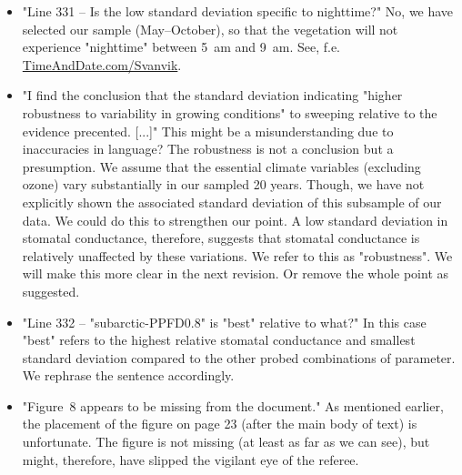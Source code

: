 \documentclass{scrartcl}
\begin{document}
\begin{itemize}
    \item {\color{blue} "Line 331 -- Is the low standard deviation specific to nighttime?"} No, we have selected our sample (May--October), so that the vegetation will not experience "nighttime" between 5~am and 9~am. See, f.e. \href{https://www.timeanddate.com/sun/@777232}{TimeAndDate.com/Svanvik}.
    \item {\color{blue} "I find the conclusion that the standard deviation indicating "higher robustness to variability in growing conditions" to sweeping relative to the evidence precented. [...]"} This might be a misunderstanding due to inaccuracies in language? The robustness is not a conclusion but a presumption. We assume that the essential climate variables (excluding ozone) vary substantially in our sampled 20 years. Though, we have not explicitly shown the associated standard deviation of this subsample of our data. We could do this to strengthen our point. A low standard deviation in stomatal conductance, therefore, suggests that stomatal conductance is relatively unaffected by these variations. We refer to this as "robustness". We will make this more clear in the next revision. Or remove the whole point as suggested.
    \item {\color{blue} "Line 332 -- "subarctic-PPFD0.8" is "best" relative to what?"} In this case "best" refers to the highest relative stomatal conductance and smallest standard deviation compared to the other probed combinations of parameter. We rephrase the sentence accordingly.
    \item {\color{blue}"Figure~8 appears to be missing from the document."} As mentioned earlier, the placement of the figure on page 23 (after the main body of text) is unfortunate. The figure is not missing (at least as far as we can see), but might, therefore, have slipped the vigilant eye of the referee.

\end{itemize}
\end{document}
